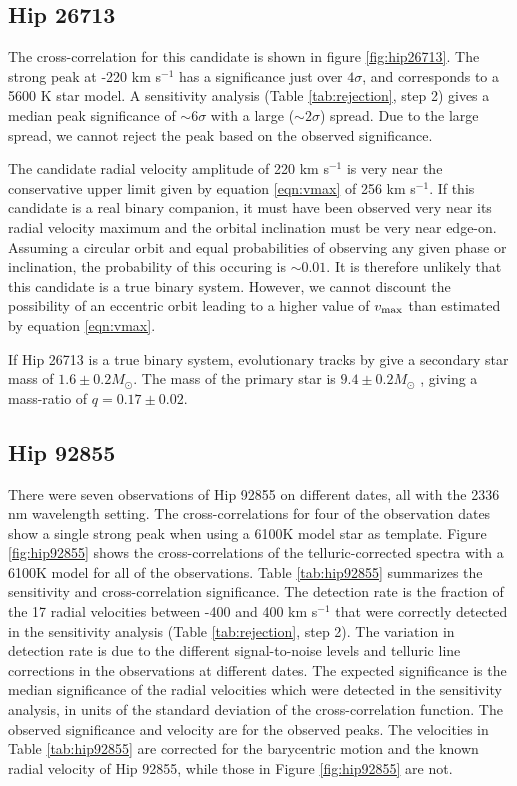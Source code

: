 \documentclass[11pt]{report}     %
\begin{document}


\subsection{Hip 26713}
The cross-correlation for this candidate is shown in figure
\ref{fig:hip26713}. The strong peak at -220 km s$^{-1}$ has a
significance just over $4\sigma$, and corresponds to a 5600 K star
model. A sensitivity analysis (Table \ref{tab:rejection}, step 2) gives a median peak significance of $\sim 6\sigma$
with a large ($\sim 2\sigma$) spread. Due to the large spread, we cannot reject
the peak based on the observed significance.

The candidate radial velocity amplitude of 220 km s$^{-1}$ is very near the conservative upper limit 
given by equation \ref{eqn:vmax} of 256 km s$^{-1}$. If this candidate is a real binary companion, it
must have been observed very near its radial velocity maximum and the orbital inclination must be very
near edge-on. Assuming a circular orbit and equal probabilities
of observing any given phase or inclination, the probability of this
occuring is $\sim 0.01$.  It is therefore unlikely that this
candidate is a true binary system. However, we cannot discount the
possibility of an eccentric orbit leading to a higher value of $v_{\rm
  max}$ than estimated by equation \ref{eqn:vmax}.
  
If Hip 26713 is a true binary system, evolutionary tracks by \cite
{Landin2008} give a secondary star mass of $1.6 \pm 0.2 M_{\odot}$. 
The mass of the primary star is $9.4 \pm 0.2 M_{\odot}$ \citep
{Tetzlaff2010}, giving a mass-ratio of $q = 0.17 \pm 0.02$.




\subsection{Hip 92855}
\label{sec:hip92855}
There were seven observations of Hip 92855 on different dates, all with the 2336 nm
wavelength setting. The cross-correlations for four of the observation dates show
a single strong peak when using a 6100K model star as template. Figure
\ref{fig:hip92855} shows the cross-correlations of the
telluric-corrected spectra with a 6100K model for all of the
observations. Table \ref{tab:hip92855} summarizes the sensitivity and
cross-correlation significance. The detection rate is the fraction of the 17
radial velocities between -400 and 400 km s$^{-1}$ that were correctly detected in the sensitivity
analysis (Table \ref{tab:rejection}, step 2). The variation in detection rate is due to the different
signal-to-noise levels and telluric line corrections in the observations
at different dates. The expected significance is the median significance of
the radial velocities which were detected in the sensitivity analysis, in units of
the standard deviation of the cross-correlation function. The observed
significance and velocity are for the observed peaks. The velocities in Table \ref{tab:hip92855} are corrected for
the barycentric motion and the known radial velocity of Hip 92855,
while those in Figure \ref{fig:hip92855} are not.
\end{document}
